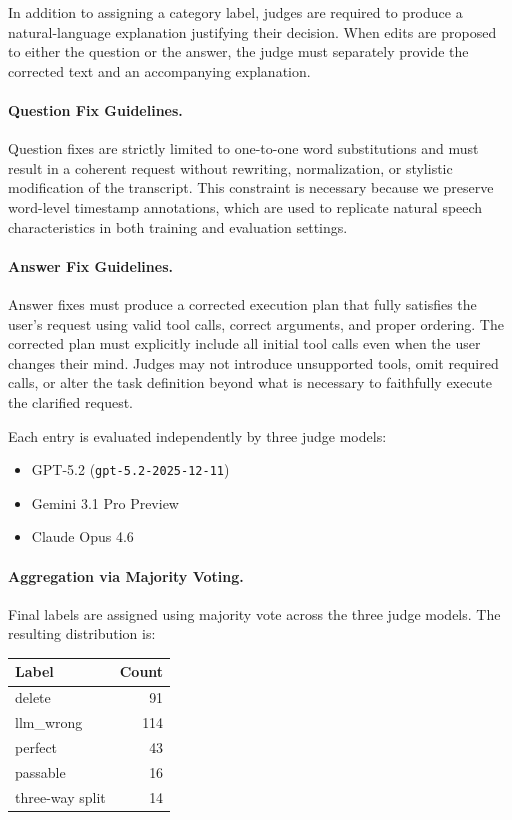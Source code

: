 In addition to assigning a category label, judges are required to produce a natural-language explanation justifying their decision. When edits are proposed to either the question or the answer, the judge must separately provide the corrected text and an accompanying explanation.

\paragraph{Question Fix Guidelines.}
Question fixes are strictly limited to one-to-one word substitutions and must result in a coherent request without rewriting, normalization, or stylistic modification of the transcript. This constraint is necessary because we preserve word-level timestamp annotations, which are used to replicate natural speech characteristics in both training and evaluation settings.

\paragraph{Answer Fix Guidelines.}
Answer fixes must produce a corrected execution plan that fully satisfies the user’s request using valid tool calls, correct arguments, and proper ordering. The corrected plan must explicitly include all initial tool calls even when the user changes their mind. Judges may not introduce unsupported tools, omit required calls, or alter the task definition beyond what is necessary to faithfully execute the clarified request.

Each entry is evaluated independently by three judge models:
\begin{itemize}
    \item GPT-5.2 (\texttt{gpt-5.2-2025-12-11})
    \item Gemini 3.1 Pro Preview
    \item Claude Opus 4.6
\end{itemize}

\paragraph{Aggregation via Majority Voting.}
Final labels are assigned using majority vote across the three judge models. The resulting distribution is:

\begin{center}
\begin{tabular}{lr}
\textbf{Label} & \textbf{Count} \\
\hline
delete & 91 \\
llm\_wrong & 114 \\
perfect & 43 \\
passable & 16 \\
three-way split & 14 \\
\end{tabular}
\end{center}

